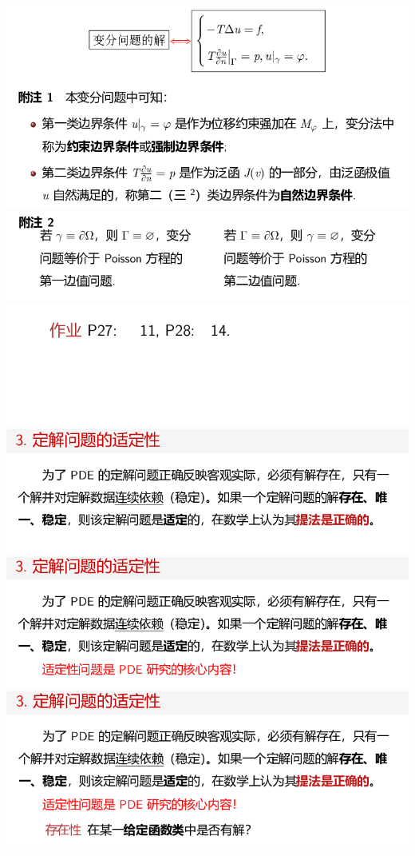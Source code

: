 \documentclass[11pt,a4paper]{ctexart}
\begin{document}
\begin{paracol}{2}
\includegraphics[width=\linewidth]{chap01_68.png}
\newpage
\includegraphics[width=\linewidth]{chap01_69.png}
\includegraphics[width=\linewidth]{chap01_70.png}
\includegraphics[width=\linewidth]{chap01_71.png}
\newpage
\includegraphics[width=\linewidth]{chap01_72.png}
\includegraphics[width=\linewidth]{chap01_73.png}

\end{paracol}
\end{document}
